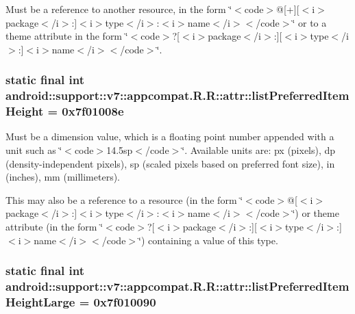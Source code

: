 Must be a reference to another resource, in the form \char`\"{}$<$code$>$@\mbox{[}+\mbox{]}\mbox{[}$<$i$>$package$<$/i$>$:\mbox{]}$<$i$>$type$<$/i$>$:$<$i$>$name$<$/i$>$$<$/code$>$\char`\"{} or to a theme attribute in the form \char`\"{}$<$code$>$?\mbox{[}$<$i$>$package$<$/i$>$:\mbox{]}\mbox{[}$<$i$>$type$<$/i$>$:\mbox{]}$<$i$>$name$<$/i$>$$<$/code$>$\char`\"{}. \hypertarget{classandroid_1_1support_1_1v7_1_1appcompat_1_1_r_1_1attr_2dafa35fa3f44cce1a4ef98ce50d0f6f}{
\subsubsection[{listPreferredItemHeight}]{\setlength{\rightskip}{0pt plus 5cm}static final int android::support::v7::appcompat.R.R::attr::listPreferredItemHeight = 0x7f01008e}}
\label{classandroid_1_1support_1_1v7_1_1appcompat_1_1_r_1_1attr_2dafa35fa3f44cce1a4ef98ce50d0f6f}


Must be a dimension value, which is a floating point number appended with a unit such as \char`\"{}$<$code$>$14.5sp$<$/code$>$\char`\"{}. Available units are: px (pixels), dp (density-independent pixels), sp (scaled pixels based on preferred font size), in (inches), mm (millimeters). 

This may also be a reference to a resource (in the form \char`\"{}$<$code$>$@\mbox{[}$<$i$>$package$<$/i$>$:\mbox{]}$<$i$>$type$<$/i$>$:$<$i$>$name$<$/i$>$$<$/code$>$\char`\"{}) or theme attribute (in the form \char`\"{}$<$code$>$?\mbox{[}$<$i$>$package$<$/i$>$:\mbox{]}\mbox{[}$<$i$>$type$<$/i$>$:\mbox{]}$<$i$>$name$<$/i$>$$<$/code$>$\char`\"{}) containing a value of this type. \hypertarget{classandroid_1_1support_1_1v7_1_1appcompat_1_1_r_1_1attr_8711a8db45962fa951254b51ea4c5369}{
\subsubsection[{listPreferredItemHeightLarge}]{\setlength{\rightskip}{0pt plus 5cm}static final int android::support::v7::appcompat.R.R::attr::listPreferredItemHeightLarge = 0x7f010090}}
\label{classandroid_1_1support_1_1v7_1_1appcompat_1_1_r_1_1attr_8711a8db45962fa951254b51ea4c5369}


